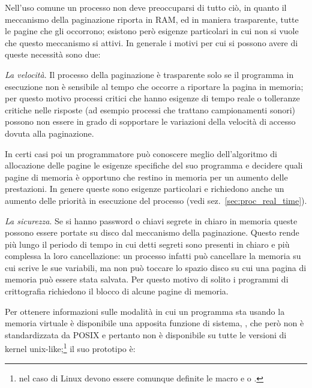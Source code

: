 Nell'uso comune un processo non deve preoccuparsi di tutto ciò, in quanto il
meccanismo della paginazione riporta in RAM, ed in maniera trasparente, tutte
le pagine che gli occorrono; esistono però esigenze particolari in cui non si
vuole che questo meccanismo si attivi. In generale i motivi per cui si possono
avere di queste necessità sono due:
\begin{itemize*}
\item \textsl{La velocità}. Il processo della paginazione è trasparente solo
  se il programma in esecuzione non è sensibile al tempo che occorre a
  riportare la pagina in memoria; per questo motivo processi critici che hanno
  esigenze di tempo reale o tolleranze critiche nelle risposte (ad esempio
  processi che trattano campionamenti sonori) possono non essere in grado di
  sopportare le variazioni della velocità di accesso dovuta alla paginazione.
  
  In certi casi poi un programmatore può conoscere meglio dell'algoritmo di
  allocazione delle pagine le esigenze specifiche del suo programma e decidere
  quali pagine di memoria è opportuno che restino in memoria per un aumento
  delle prestazioni. In genere queste sono esigenze particolari e richiedono
  anche un aumento delle priorità in esecuzione del processo (vedi
  sez.~\ref{sec:proc_real_time}).
  
\item \textsl{La sicurezza}. Se si hanno password o chiavi segrete in chiaro
  in memoria queste possono essere portate su disco dal meccanismo della
  paginazione. Questo rende più lungo il periodo di tempo in cui detti segreti
  sono presenti in chiaro e più complessa la loro cancellazione: un processo
  infatti può cancellare la memoria su cui scrive le sue variabili, ma non può
  toccare lo spazio disco su cui una pagina di memoria può essere stata
  salvata. Per questo motivo di solito i programmi di crittografia richiedono
  il blocco di alcune pagine di memoria.
\end{itemize*}

Per ottenere informazioni sulle modalità in cui un programma sta usando la
memoria virtuale è disponibile una apposita funzione di sistema,
, che però non è standardizzata da POSIX e pertanto non è
disponibile su tutte le versioni di kernel unix-like;\footnote{nel caso di
  Linux devono essere comunque definite le macro  e
   o .}  il suo prototipo è:

